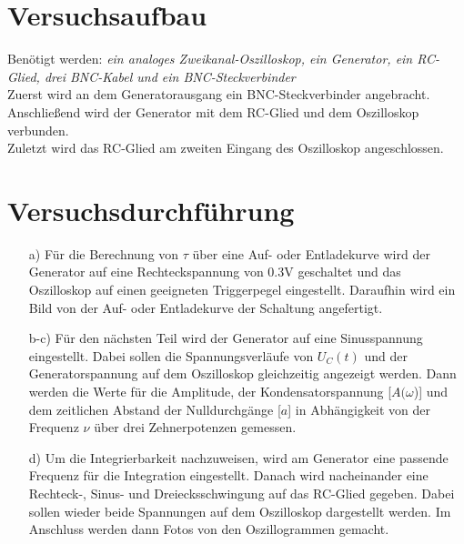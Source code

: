 \section{Versuchsaufbau}\justifying

Benötigt werden: \textit{ein analoges Zweikanal-Oszilloskop, ein Generator, ein RC-Glied, drei BNC-Kabel und ein BNC-Steckverbinder }\\
Zuerst wird an dem Generatorausgang ein BNC-Steckverbinder angebracht.\\ 
Anschließend wird der Generator mit dem RC-Glied und dem Oszilloskop verbunden. \\
Zuletzt wird das RC-Glied am zweiten Eingang des Oszilloskop angeschlossen.


\newpage
\section{Versuchsdurchführung}\justifying

\begin{enumerate}
\item[a)] Für die Berechnung von $\tau$ über eine Auf- oder Entladekurve wird der 
          Generator auf eine Rechteckspannung von 0.3V geschaltet und das Oszilloskop
          auf einen geeigneten Triggerpegel eingestellt. Daraufhin wird ein Bild von der Auf- 
          oder Entladekurve der Schaltung angefertigt.\\
\item[b-c)] Für den nächsten Teil wird der Generator auf eine Sinusspannung 
          eingestellt. Dabei sollen die Spannungsverläufe von $U_C(t)$ und der 
          Generatorspannung auf dem Oszilloskop gleichzeitig angezeigt werden. 
          Dann werden die Werte für die Amplitude, der Kondensatorspannung 
          [$A(\omega$)] und dem zeitlichen Abstand der Nulldurchgänge 
          [$a$] in Abhängigkeit von der Frequenz $\nu$ über drei Zehnerpotenzen gemessen.\\
\item[d)] Um die Integrierbarkeit nachzuweisen, wird am Generator eine passende 
          Frequenz für die Integration eingestellt. Danach wird nacheinander eine 
          Rechteck-, Sinus- und Dreiecksschwingung auf das RC-Glied gegeben. 
          Dabei sollen wieder beide Spannungen auf dem Oszilloskop dargestellt 
          werden. Im Anschluss werden dann Fotos von den Oszillogrammen gemacht.
\end{enumerate}

